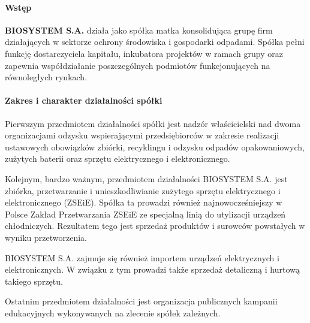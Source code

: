 

\paragraph{Wstęp}
\textbf{BIOSYSTEM S.A.} działa jako spółka matka konsolidująca grupę firm działających w sektorze ochrony środowiska i gospodarki odpadami. Spółka pełni funkcję dostarczyciela kapitału, inkubatora projektów w ramach grupy oraz zapewnia współdziałanie poszczególnych podmiotów funkcjonujących na równoległych rynkach.

\paragraph{Zakres i charakter działalności spółki}

Pierwszym przedmiotem działalności spółki jest nadzór właścicielski nad dwoma organizacjami odzysku wspierającymi przedsiębiorców w zakresie realizacji ustawowych obowiązków zbiórki, recyklingu i odzysku odpadów opakowaniowych, zużytych baterii oraz sprzętu elektrycznego i elektronicznego.

Kolejnym, bardzo ważnym, przedmiotem działalności BIOSYSTEM S.A. jest zbiórka, przetwarzanie i unieszkodliwianie zużytego sprzętu elektrycznego i elektronicznego (ZSEiE). Spółka ta prowadzi również najnowocześniejszy w Polsce Zakład Przetwarzania ZSEiE ze specjalną linią do utylizacji urządzeń chłodniczych. Rezultatem tego jest sprzedaż produktów i surowców powstałych w wyniku przetworzenia.

BIOSYSTEM S.A. zajmuje się również importem urządzeń elektrycznych i elektronicznych. W związku z tym prowadzi także sprzedaż detaliczną i hurtową takiego sprzętu.

Ostatnim przedmiotem działalności jest organizacja publicznych kampanii edukacyjnych wykonywanych na zlecenie spółek zależnych.